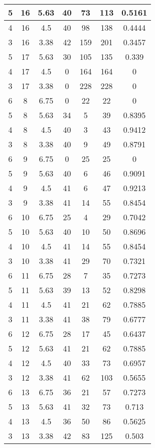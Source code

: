 \documentclass[letterpaper, 12pt]{article}
\begin{document}
\begin{longtable}{|c|c|c|c|c|c|c|}
\hline
5 & 16 & 5.63 & 40 & 73 & 113 & 0.5161 \\
\hline
4 & 16 & 4.5 & 40 & 98 & 138 & 0.4444 \\
\hline
3 & 16 & 3.38 & 42 & 159 & 201 & 0.3457 \\
\hline
5 & 17 & 5.63 & 30 & 105 & 135 & 0.339 \\
\hline
4 & 17 & 4.5 & 0 & 164 & 164 & 0 \\
\hline
3 & 17 & 3.38 & 0 & 228 & 228 & 0 \\
\hline
6 & 8 & 6.75 & 0 & 22 & 22 & 0 \\
\hline
5 & 8 & 5.63 & 34 & 5 & 39 & 0.8395 \\
\hline
4 & 8 & 4.5 & 40 & 3 & 43 & 0.9412 \\
\hline
3 & 8 & 3.38 & 40 & 9 & 49 & 0.8791 \\
\hline
6 & 9 & 6.75 & 0 & 25 & 25 & 0 \\
\hline
5 & 9 & 5.63 & 40 & 6 & 46 & 0.9091 \\
\hline
4 & 9 & 4.5 & 41 & 6 & 47 & 0.9213 \\
\hline
3 & 9 & 3.38 & 41 & 14 & 55 & 0.8454 \\
\hline
6 & 10 & 6.75 & 25 & 4 & 29 & 0.7042 \\
\hline
5 & 10 & 5.63 & 40 & 10 & 50 & 0.8696 \\
\hline
4 & 10 & 4.5 & 41 & 14 & 55 & 0.8454 \\
\hline
3 & 10 & 3.38 & 41 & 29 & 70 & 0.7321 \\
\hline
6 & 11 & 6.75 & 28 & 7 & 35 & 0.7273 \\
\hline
5 & 11 & 5.63 & 39 & 13 & 52 & 0.8298 \\
\hline
4 & 11 & 4.5 & 41 & 21 & 62 & 0.7885 \\
\hline
3 & 11 & 3.38 & 41 & 38 & 79 & 0.6777 \\
\hline
6 & 12 & 6.75 & 28 & 17 & 45 & 0.6437 \\
\hline
5 & 12 & 5.63 & 41 & 21 & 62 & 0.7885 \\
\hline
4 & 12 & 4.5 & 40 & 33 & 73 & 0.6957 \\
\hline
3 & 12 & 3.38 & 41 & 62 & 103 & 0.5655 \\
\hline
6 & 13 & 6.75 & 36 & 21 & 57 & 0.7273 \\
\hline
5 & 13 & 5.63 & 41 & 32 & 73 & 0.713 \\
\hline
4 & 13 & 4.5 & 36 & 50 & 86 & 0.5625 \\
\hline
3 & 13 & 3.38 & 42 & 83 & 125 & 0.503 \\

\end{longtable}
\end{document}
